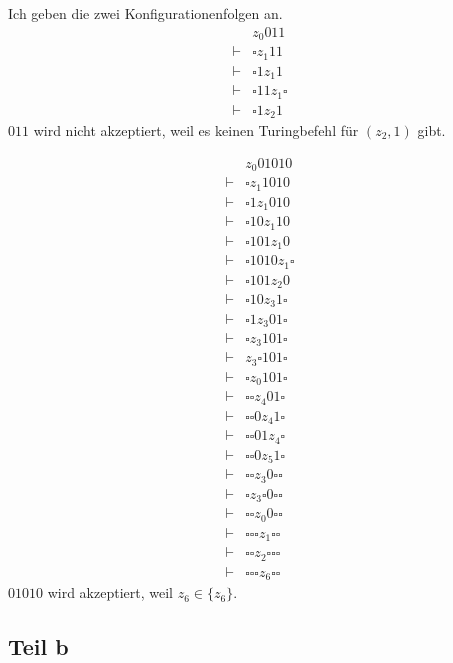 \documentclass[10pt,a4paper]{article}
\begin{document}
Ich geben die zwei Konfigurationenfolgen an.
\begin{align*}
  & z_{0}011\\
  \vdash & \square z_{1} 11\\
  \vdash & \square 1 z_{1} 1\\
  \vdash & \square 11 z_{1} \square\\
  \vdash & \square 1 z_{2} 1
\end{align*}
$011$ wird nicht akzeptiert, weil es keinen Turingbefehl für $(z_{2}, 1)$ gibt.

\begin{align*}
  & z_{0}01010\\
  \vdash & \square z_{1} 1010\\
  \vdash & \square 1 z_{1} 010\\
  \vdash & \square 10 z_{1} 10\\
  \vdash & \square 101 z_{1} 0\\
  \vdash & \square 1010 z_{1} \square\\
  \vdash & \square 101 z_{2} 0\\
  \vdash & \square 10 z_{3} 1 \square\\
  \vdash & \square 1 z_{3} 01 \square\\
  \vdash & \square z_{3} 101 \square\\
  \vdash & z_{3} \square 101 \square\\
  \vdash & \square z_{0} 101 \square\\
  \vdash & \square \square z_{4} 01 \square\\
  \vdash & \square \square 0 z_{4} 1 \square\\
  \vdash & \square \square 01 z_{4} \square\\
  \vdash & \square \square 0 z_{5} 1 \square\\
  \vdash & \square \square z_{3} 0 \square \square\\
  \vdash & \square z_{3} \square 0 \square \square\\
  \vdash & \square \square z_{0} 0 \square \square\\
  \vdash & \square \square \square z_{1} \square \square\\
  \vdash & \square \square z_{2} \square \square \square\\
  \vdash & \square \square \square z_{6} \square \square
\end{align*}
$01010$ wird akzeptiert, weil $z_{6} \in \{ z_{6} \}$.

\subsection{Teil b}
\end{document}
